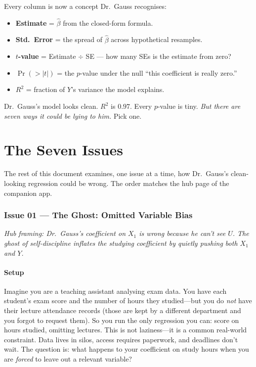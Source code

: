 \documentclass[11pt,a4paper]{article}
\theoremstyle{definition}
\theoremstyle{plain}
\theoremstyle{remark}
\newcommand{\bhat}{\hat{\beta}}
\begin{document}
Every column is now a concept Dr.\ Gauss recognises:
\begin{itemize}[nosep]
  \item \textbf{Estimate} = $\bhat$ from the closed-form formula.
  \item \textbf{Std.\ Error} = the spread of $\bhat$ across hypothetical resamples.
  \item \textbf{$t$-value} = Estimate $\div$ SE --- how many SEs is the estimate from zero?
  \item \textbf{$\Pr(>|t|)$} = the $p$-value under the null ``this coefficient is really zero.''
  \item \textbf{$R^2$} = fraction of $Y$'s variance the model explains.
\end{itemize}

Dr.\ Gauss's model looks clean. $R^2$ is $0.97$. Every $p$-value is tiny. \emph{But there are seven ways it could be lying to him.} Pick one.

\part{The Seven Issues}\label{part:issues}

The rest of this document examines, one issue at a time, how Dr.\ Gauss's clean-looking regression could be wrong. The order matches the hub page of the companion app.

\section{Issue 01 --- The Ghost: Omitted Variable Bias}\label{sec:ovb}

\noindent\emph{Hub framing: Dr.\ Gauss's coefficient on $X_1$ is wrong because he can't see $U$. The ghost of self-discipline inflates the studying coefficient by quietly pushing both $X_1$ and $Y$.}

\subsection{Setup}

Imagine you are a teaching assistant analysing exam data. You have each student's exam score and the number of hours they studied---but you do \emph{not} have their lecture attendance records (those are kept by a different department and you forgot to request them). So you run the only regression you can: score on hours studied, omitting lectures. This is not laziness---it is a common real-world constraint. Data lives in silos, access requires paperwork, and deadlines don't wait. The question is: what happens to your coefficient on study hours when you are \emph{forced} to leave out a relevant variable?
\end{document}
